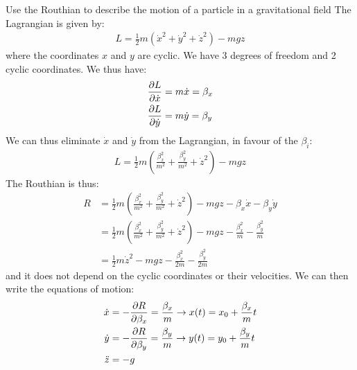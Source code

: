 \begin{example}{0pt}{Use the Routhian to describe the motion of a particle in a gravitational field}{}
The Lagrangian is given by:
\begin{align*}
L=\frac{1}{2}m(\dot{x}^2+\dot{y}^2+\dot{z}^2)-mgz
\end{align*}
where the coordinates $x$ and $y$ are cyclic. We have 3 degrees of freedom and 2 cyclic coordinates. We thus have:
\begin{align*}
\frac{\partial L}{\partial \dot{x}}&=m\dot{x}=\beta_x\\
\frac{\partial L}{\partial \dot{y}}&=m\dot{y}=\beta_y
\end{align*}
We can thus eliminate $\dot{x}$ and $\dot{y}$ from the Lagrangian, in favour of the $\beta_i$:
\begin{align*}
L=\frac{1}{2}m\left(\frac{\beta_x^2}{m^2}+\frac{\beta_y^2}{m^2}+\dot{z}^2\right)-mgz
\end{align*}
The Routhian is thus:
\begin{align*}
R&=\frac{1}{2}m\left(\frac{\beta_x^2}{m^2}+\frac{\beta_y^2}{m^2}+\dot{z}^2\right)-mgz-\beta_x\dot{x}-\beta_y\dot{y}\nonumber\\
&=\frac{1}{2}m\left(\frac{\beta_x^2}{m^2}+\frac{\beta_y^2}{m^2}+\dot{z}^2\right)-mgz-\frac{\beta_x^2}{m}-\frac{\beta_y^2}{m}\nonumber\\
&=\frac{1}{2}m\dot{z}^2-mgz-\frac{\beta_x^2}{2m}-\frac{\beta_y^2}{2m}
\end{align*}
and it does not depend on the cyclic coordinates or their velocities.
We can then write the equations of motion:
\begin{align*}
\dot{x}&=-\frac{\partial R}{\partial \beta_x}=\frac{\beta_x}{m}\to x(t)=x_0+\frac{\beta_x}{m}t\\
\dot{y}&=-\frac{\partial R}{\partial \beta_y}=\frac{\beta_y}{m}\to y(t)=y_0+\frac{\beta_y}{m}t\\
\ddot{z}&=-g
\end{align*}
\end{example}


